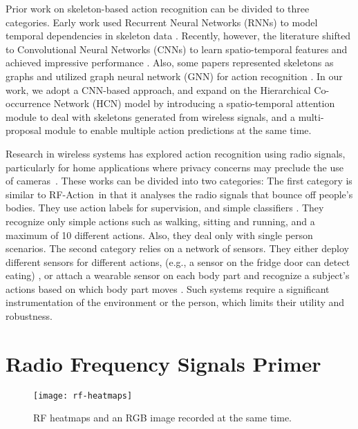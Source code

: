 \documentclass[10pt,twocolumn,letterpaper]{article}
\newcommand{\name} {RF-Action}
\begin{document}
Prior work on skeleton-based action recognition can be divided to three categories. Early work used Recurrent Neural Networks (RNNs) to model temporal dependencies in skeleton data \cite{du2015hierarchical,shahroudy2016ntu,zhu2016co}. Recently, however, the literature shifted to Convolutional Neural Networks (CNNs) to learn spatio-temporal features and achieved impressive performance \cite{du2015skeleton,li2018co,ke2017new}. Also, some papers represented skeletons as graphs and utilized graph neural network (GNN) for action recognition \cite{yan2018spatial, gao2018generalized}. In our work, we adopt a CNN-based approach, and expand on the Hierarchical Co-occurrence Network (HCN) model \cite{li2018co} by introducing a spatio-temporal attention module to deal with skeletons generated from wireless signals, and a multi-proposal module to enable multiple action predictions at the same time.



\vskip  0.06in
Research in wireless systems has explored action recognition using radio signals, particularly for home applications where privacy concerns may preclude the use of cameras~\cite{wang2014eyes, guo2017novel,pu2013whole,abdelnasser2015wigest}.  These works can be divided into two categories:  The first category is similar to \name\ in that it analyses the radio signals that bounce off people's bodies. They use action labels for supervision, and simple classifiers \cite{wang2014eyes, guo2017novel, pu2013whole, abdelnasser2015wigest}.  They recognize only simple actions such as walking, sitting and running, and a maximum of 10 different actions. Also, they deal only with single person scenarios. The second category relies on a network of sensors. They either deploy different sensors for different actions, (e.g., a sensor on the fridge door can detect eating) \cite{kasteren2010activity, yang2011activity}, or attach a wearable sensor on each body part and recognize a subject's actions based on which body part moves \cite{keally2011pbn}. Such  systems require a significant instrumentation of the environment or the person, which limits their utility and robustness.

 \section{Radio Frequency Signals Primer}

\begin{figure}[t]
\centering
\texttt{[image: rf-heatmaps]}
\caption{\footnotesize{RF heatmaps and an RGB image recorded at the same time.}}	\label{fig:rf-heatmaps}
\end{figure}
\end{document}
